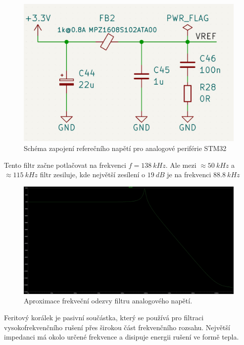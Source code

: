 \begin{figure}[H]
    \centering
    \includegraphics[width=1\linewidth]{pictures/stm_analog_reference.jpg}
    \caption{Schéma zapojení referečního napětí pro analogové periférie STM32}
    \label{fig:stm32_vref}
\end{figure}

Tento filtr začne potlačovat na frekvenci $f = 138 \ kHz$. Ale mezi $\approx 50 \ kHz$ a $ \approx 115 \ kHz$ filtr zesiluje, kde největší zesílení o $19 \ dB$ je na frekvenci $88.8 \ kHz$

\begin{figure}[H]
    \centering
    \includegraphics[width=1\linewidth]{pictures/cardi_vref_filter_response.jpg}
    \caption{Aproximace frekveční odezvy filtru analogového napětí.}
    \label{fig:stm32_vref_response}
\end{figure}

Feritový korálek je pasivní součástka, který se používá pro filtraci vysokofrekvenčního rušení přes širokou část frekvenčního rozsahu. Největší impedanci má okolo určené frekvence a disipuje energii rušení ve formě tepla.


